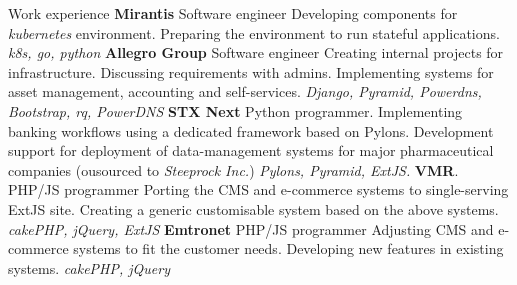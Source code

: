 \begin{rubric}{Work experience}
\textbf{Mirantis}\newline
    Software engineer\newline
    Developing components for \textit{kubernetes} environment. Preparing the
    environment to run stateful applications.
    \textit{k8s, go, python}
\textbf{Allegro Group}\newline
    Software engineer\newline
    Creating internal projects for infrastructure. Discussing requirements with
    admins. Implementing systems for asset management, accounting and
    self-services.
    \textit{Django, Pyramid, Powerdns, Bootstrap, rq, PowerDNS}
\textbf{STX Next}\newline
    Python programmer.\newline
    Implementing banking workflows using a dedicated framework based on Pylons.
    Development support for deployment of data-management systems for major
    pharmaceutical companies (ousourced to \textit{Steeprock Inc.})
    \textit{Pylons, Pyramid, ExtJS.}\newline
{}\textbf{VMR}.
    PHP/JS programmer\newline
    Porting the CMS and \hbox{e-commerce} systems to single-serving ExtJS site.
    Creating a generic customisable system based on the above systems.
    \textit{cakePHP, jQuery, ExtJS}
\textbf{Emtronet} 
    PHP/JS programmer\newline
    Adjusting CMS and \hbox{e-commerce} systems to fit the customer needs.
    Developing new features in existing systems.
    \textit{cakePHP, jQuery}
\end{rubric}
